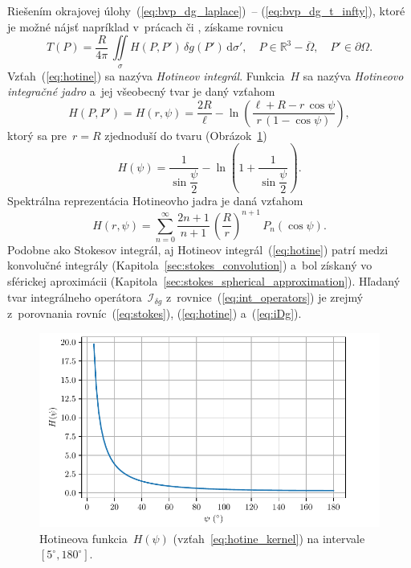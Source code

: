 \documentclass[a4paper,12pt]{book}
\newcommand{\diff}{\mathrm d}
\begin{document}
Riešením okrajovej úlohy~(\ref{eq:bvp_dg_laplace})~-- 
(\ref{eq:bvp_dg_t_infty}), ktoré je možné nájsť napríklad v~prácach 
\textcite{MoritzPhysicalGeodesy} či \textcite{SansoGeoidDetermination}, získame 
rovnicu
%
\begin{equation}
\label{eq:hotine}
T(P) = \frac{R}{4\pi} \, \iint\limits_{\sigma} H(P, P') \, \delta g(P') \, 
\diff \sigma'{,} \quad P \in \mathbb{R}^3 - \overline\Omega{,} \quad P' \in 
\partial\Omega{.}
\end{equation}
%
Vzťah~(\ref{eq:hotine}) sa nazýva \emph{Hotineov integrál}.  Funkcia~$H$ sa 
nazýva \emph{Hotineovo integračné jadro} a~jej všeobecný tvar je daný vzťahom 
\parencite{SansoGeoidDetermination}
%
\begin{equation}
\label{eq:hotine_kernel_general}
H(P, P') = H(r, \psi) = \frac{2R}{\ell} - \ln\left(\frac{\ell + R - r \, 
\cos\psi}{r \, (1 - \cos\psi)}\right){,}
\end{equation}
%
ktorý sa pre~$r = R$ zjednoduší do tvaru (Obrázok~\ref{fig:hotine_kernel})
%
\begin{equation}
\label{eq:hotine_kernel}
H(\psi) = \frac{1}{\sin\dfrac{\psi}{2}} - \ln\left( 
1 + \frac{1}{\sin\dfrac{\psi}{2}} \right){.}
\end{equation}
%
Spektrálna reprezentácia Hotineovho jadra je daná vzťahom
%
\begin{equation}
\label{eq:hotine_spectral}
H(r, \psi) = \sum_{n = 0}^{\infty} \frac{2n + 1}{n + 1} \, \left( \frac{R}{r} 
\right)^{n + 1} \, P_n(\cos\psi){.}
\end{equation}
%
Podobne ako Stokesov integrál, aj Hotineov integrál~(\ref{eq:hotine}) patrí 
medzi konvolučné integrály (Kapitola~\ref{sec:stokes_convolution}) a~bol 
získaný vo sférickej aproximácii 
(Kapitola~\ref{sec:stokes_spherical_approximation}).  Hľadaný tvar integrálneho 
operátora~$\mathcal{I}_{\delta g}$ z~rovnice~(\ref{eq:int_operators}) je zrejmý 
z~porovnania rovníc~(\ref{eq:stokes}), (\ref{eq:hotine}) a~(\ref{eq:iDg}).

\begin{figure}[bt]
\centering
\includegraphics{./fig-hotine-kernel.pdf}
\caption{Hotineova funkcia~$H(\psi)$ (vzťah~\ref{eq:hotine_kernel}) na 
intervale~$[5^\circ, 180^\circ]$.}
\label{fig:hotine_kernel}
\end{figure}
\end{document}
